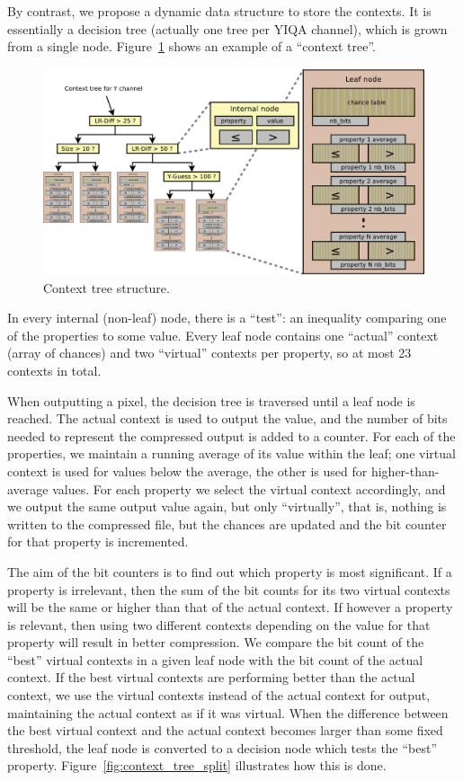 \documentclass[a4paper,USenglish]{lipics}
\begin{document}
By contrast, we propose a dynamic data structure to store the contexts. It is essentially
a decision tree (actually one tree per YIQA channel), which is grown from a single node.
Figure~\ref{fig:context_tree} shows an example of a ``context tree''.


\begin{figure}
\begin{center}
\includegraphics[width=\textwidth]{images/context_tree}
\end{center}
\caption{Context tree structure.}
\label{fig:context_tree}
\end{figure}

In every internal (non-leaf) node, there is a ``test'': an inequality comparing one of the properties
to some value. Every leaf node contains one ``actual'' context (array of chances)
and two ``virtual'' contexts per property, so at most 23 contexts in total.

When outputting a pixel, the decision tree is traversed until a leaf node is reached.
The actual context is used to output the value, and the number of bits needed to
represent the compressed output is added to a counter.
For each of the properties, we maintain a running average of its value within the leaf;
one virtual context is used for values below the average, the other is used for higher-than-average 
values. For each property we select the virtual context accordingly,
and we output the same output value again, but only ``virtually'', that is,
nothing is written to the compressed file, but the chances are updated and the bit counter
for that property is incremented.

The aim of the bit counters is to find out which property is most significant.
If a property is irrelevant, then the sum of the bit counts for its two virtual contexts will be the same
or higher than that of the actual context. If however a property is relevant, then using two different
contexts depending on the value for that property will result in better compression.
We compare the bit count of the ``best'' virtual contexts in a given leaf node with the
bit count of the actual context.
If the best virtual contexts are performing better than the actual context,
we use the virtual contexts instead of the actual context for output, maintaining
the actual context as if it was virtual.
When the difference between the best virtual context and the actual context
becomes larger than some fixed
threshold, the leaf node is converted to a decision node which tests the ``best'' property.
Figure~\ref{fig:context_tree_split} illustrates how this is done.
\end{document}
